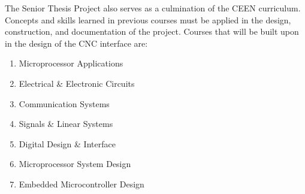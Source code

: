 The Senior Thesis Project also serves as a culmination of the CEEN curriculum. Concepts and skills learned in previous courses must be applied in the design, construction, and documentation of the project.
Courses that will be built upon in the design of the CNC interface are:
\begin{enumerate} \parskip2pt
	\item Microprocessor Applications
	\item Electrical \& Electronic Circuits
	\item Communication Systems
	\item Signals \& Linear Systems
	\item Digital Design \& Interface
	\item Microprocessor System Design
	\item Embedded Microcontroller Design
\end{enumerate}
